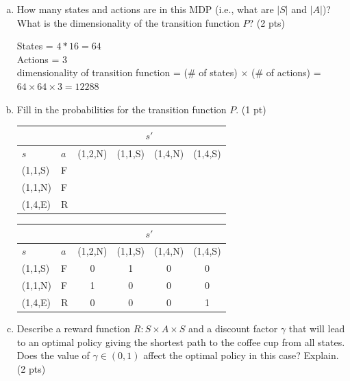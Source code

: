 \documentclass[12pt]{article}
\begin{document}
\begin{enumerate}[a)]
\item  How many states and actions are in this MDP (i.e., what are $|S|$ and $|A|$)? What is the dimensionality of the transition function $P$? (2 pts)

\begin{solution}
States = $4*16 = 64$ \\
Actions = 3 \\
dimensionality of transition function = (\# of states) $\times$ (\# of actions) = $64 \times 64 \times 3 = 12288$
\end{solution}

\item Fill in the probabilities for the transition function $P$. (1 pt)\\
  \begin{center}
    \begin{tabular}{|l|l||c|c|c|c|}\hline
      \multicolumn{2}{|c|}{} &
                               \multicolumn{4}{|c|}{$s'$}\\\hline
      $s$ & $a$ & (1,2,N) & (1,1,S) & (1,4,N) & (1,4,S)\\\hline
      (1,1,S) & F & & & &\\ \hline
      (1,1,N) & F & & & &\\ \hline
      (1,4,E) & R & & & &\\ \hline
    \end{tabular}
  \end{center}

\begin{solution}
\begin{center}
    \begin{tabular}{|l|l||c|c|c|c|}\hline
      \multicolumn{2}{|c|}{} &
                               \multicolumn{4}{|c|}{$s'$}\\\hline
      $s$ & $a$ & (1,2,N) & (1,1,S) & (1,4,N) & (1,4,S)\\\hline
      (1,1,S) & F & 0 & 1 & 0 & 0 \\ \hline
      (1,1,N) & F & 1 & 0 & 0 & 0 \\ \hline
      (1,4,E) & R & 0 & 0 & 0 & 1 \\ \hline
    \end{tabular}
  \end{center}
\end{solution}

\item Describe a reward function $R : S \times A \times S$ and a discount factor $\gamma$ that will lead to an optimal policy giving the shortest path to the coffee cup from all states. Does the value of $\gamma \in (0,1)$ affect the optimal policy in this case? Explain. (2 pts)


\end{enumerate}
\end{document}
